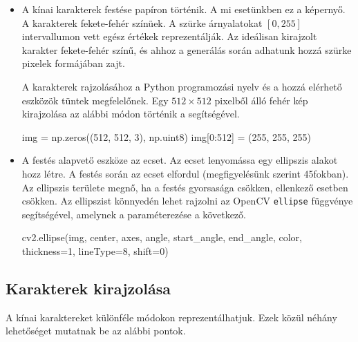 \begin{itemize}
\item A kínai karakterek festése papíron történik. A mi esetünkben ez a képernyő. A karakterek fekete-fehér színüek. A szürke árnyalatokat $[0, 255]$ intervallumon vett egész értékek reprezentálják. Az ideálisan kirajzolt karakter fekete-fehér színű, és ahhoz a generálás során adhatunk hozzá szürke pixelek formájában zajt.

A karakterek rajzolásához a Python programozási nyelv és a hozzá elérhető eszközök tüntek megfelelőnek. Egy $512 \times 512$ pixelből álló fehér kép kirajzolása az alábbi módon történik a segítségével.
\begin{python}
img = np.zeros((512, 512, 3), np.uint8)
img[0:512] = (255, 255, 255)
\end{python}

\item A festés alapvető eszköze az ecset. Az ecset lenyomássa egy ellipszis alakot hozz létre. A festés során az ecset elfordul (megfigyelésünk szerint 45fokban). Az ellipszis területe megnő, ha a festés gyorsasága csökken, ellenkező esetben csökken. Az ellipszist könnyedén lehet rajzolni az OpenCV \texttt{ellipse} függvénye segítségével, amelynek a paraméterezése a következő.
\begin{python}
cv2.ellipse(img, center, axes, angle, start_angle, 
	end_angle, color, thickness=1, lineType=8, shift=0) 
\end{python}
\end{itemize}

\subsection{Karakterek kirajzolása}

A kínai karaktereket különféle módokon reprezentálhatjuk. Ezek közül néhány lehetőséget mutatnak be az alábbi pontok.

